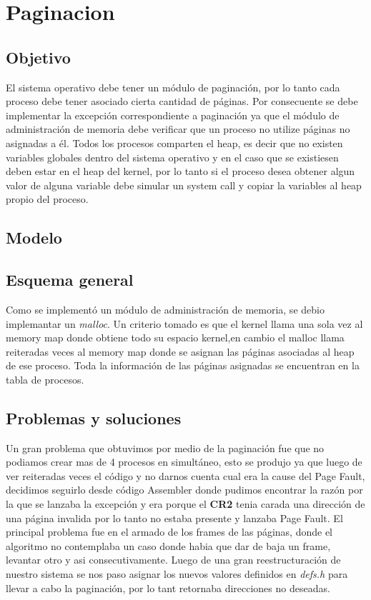 \documentclass[10pt,a4paper]{article}
\begin{document}
\section{Paginacion}
	\subsection{Objetivo}
		El sistema operativo debe tener un m\'odulo de paginaci\'on, por lo tanto cada proceso debe tener asociado cierta cantidad de p\'aginas. Por consecuente se debe implementar la excepci\'on correspondiente a paginaci\'on ya que el m\'odulo de administraci\'on de memoria debe verificar que un proceso no utilize p\'aginas no asignadas a \'el. Todos los procesos comparten el heap, es decir que no existen variables globales dentro del sistema operativo y en el caso que se existiesen deben estar en el heap del kernel, por lo tanto si el proceso desea obtener algun valor de alguna variable debe simular un system call y copiar la variables al heap propio del proceso.
	\subsection{Modelo}
	\subsection{Esquema general}
		Como se implement\'o un m\'odulo de administraci\'on de memoria, se debio implemantar un \textit{malloc}. Un criterio tomado es que el kernel llama una sola vez al memory map donde obtiene todo su espacio kernel,en cambio el malloc llama reiteradas veces al memory map donde se asignan las p\'aginas asociadas al heap de ese proceso. Toda la informaci\'on de las p\'aginas asignadas se encuentran en la tabla de procesos.
	\subsection{Problemas y soluciones}
		Un gran problema que obtuvimos por medio de la paginaci\'on fue que no podiamos crear mas de 4 procesos en simult\'aneo, esto se produjo ya que luego de ver reiteradas veces el c\'odigo y no darnos cuenta cual era la cause del Page Fault, decidimos seguirlo desde c\'odigo Assembler donde pudimos encontrar la raz\'on por la que se lanzaba la excepci\'on y era porque el \textbf{CR2} tenia carada una direcci\'on de una p\'agina invalida por lo tanto no estaba presente y lanzaba Page Fault. El principal problema fue en el armado de los frames de las p\'aginas, donde el algoritmo no contemplaba un caso donde habia que dar de baja un frame, levantar otro y asi consecutivamente. Luego de una gran reestructuraci\'on de nuestro sistema se nos paso asignar los nuevos valores definidos en \textit{defs.h} para llevar a cabo la paginaci\'on, por lo tant retornaba direcciones no deseadas.
\end{document}
